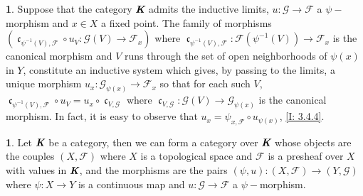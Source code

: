 \documentclass[12pt]{amsart}
\newcommand{\can}{\operatorname{\mathfrak{c}}}
\theoremstyle{definition}
\newtheorem{bk}[proposition]{}
\begin{document}
\begin{bk}
Suppose that the category $\emph{\textbf{K}}$ admits the inductive limits, $u:\mathscr{G}\rightarrow\mathscr{F}$ a $\psi-$morphism and $x\in X$ a fixed point. The family of morphisms $(\can_{\psi^{-1}(V),\mathscr{F}}\circ u_{V}:\mathscr{G}(V)\rightarrow\mathscr{F}_{x})$ where $\can_{\psi^{-1}(V),\mathscr{F}}:\mathscr{F}(\psi^{-1}(V))
\rightarrow\mathscr{F}_{x}$ is the canonical morphism and $V$ runs through the set of open neighborhoods of $\psi(x)$ in $Y$, constitute an inductive system which gives, by passing to the limits, a unique morphism $u_{x}:\mathscr{G}_{\psi(x)}\rightarrow\mathscr{F}_{x}$ so that for each such $V$, $\can_{\psi^{-1}(V),\mathscr{F}}\circ u_{V}=u_{x}\circ\can_{V,\mathscr{G}}$ where $\can_{V,\mathscr{G}}:\mathscr{G}(V)\rightarrow\mathscr{G}_{\psi(x)}$ is the canonical morphism. In fact, it is easy to observe that  $u_{x}=\psi_{x,\mathscr{F}}\circ u_{\psi(x)}$, \ref{I: 3.4.4}.

\end{bk}


\begin{bk}\label{I: 3.5.2} Let $\emph{\textbf{K}}$ be a category, then we can form a category over $\emph{\textbf{K}}$ whose objects are the couples $(X,\mathscr{F})$ where $X$ is a topological space and $\mathscr{F}$ is a presheaf over $X$ with values in $\emph{\textbf{K}}$, and the morphisms are the pairs $(\psi, u):(X,\mathscr{F})\rightarrow(Y, \mathscr{G})$ where $\psi:X\rightarrow Y$ is a continuous map and $u:\mathscr{G}\rightarrow\mathscr{F}$ a $\psi-$morphism.

\end{bk}
\end{document}
